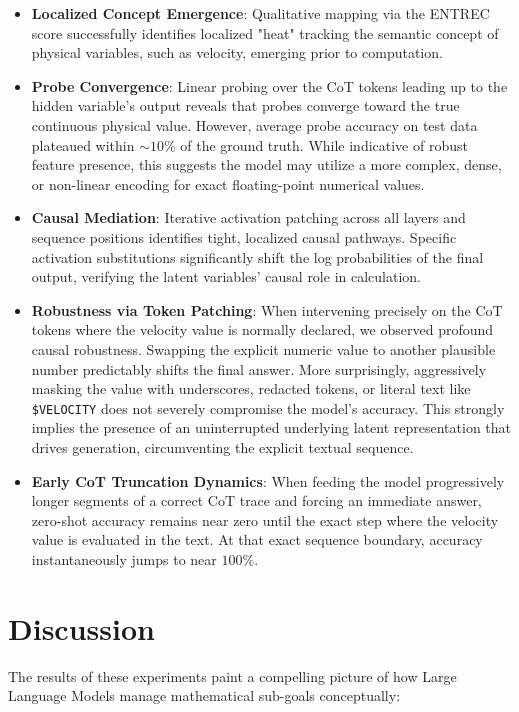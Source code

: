 \documentclass[11pt]{article}
\begin{document}
\begin{itemize}
    \item \textbf{Localized Concept Emergence}: Qualitative mapping via the ENTREC score successfully identifies localized "heat" tracking the semantic concept of physical variables, such as velocity, emerging prior to computation.
    \item \textbf{Probe Convergence}: Linear probing over the CoT tokens leading up to the hidden variable's output reveals that probes converge toward the true continuous physical value. However, average probe accuracy on test data plateaued within $\sim10\%$ of the ground truth. While indicative of robust feature presence, this suggests the model may utilize a more complex, dense, or non-linear encoding for exact floating-point numerical values.
    \item \textbf{Causal Mediation}: Iterative activation patching across all layers and sequence positions identifies tight, localized causal pathways. Specific activation substitutions significantly shift the log probabilities of the final output, verifying the latent variables' causal role in calculation.
    \item \textbf{Robustness via Token Patching}: When intervening precisely on the CoT tokens where the velocity value is normally declared, we observed profound causal robustness. Swapping the explicit numeric value to another plausible number predictably shifts the final answer. More surprisingly, aggressively masking the value with underscores, redacted tokens, or literal text like \texttt{\$VELOCITY} does not severely compromise the model's accuracy. This strongly implies the presence of an uninterrupted underlying latent representation that drives generation, circumventing the explicit textual sequence.
    \item \textbf{Early CoT Truncation Dynamics}: When feeding the model progressively longer segments of a correct CoT trace and forcing an immediate answer, zero-shot accuracy remains near zero until the exact step where the velocity value is evaluated in the text. At that exact sequence boundary, accuracy instantaneously jumps to near $100\%$. 
\end{itemize}

\section{Discussion}

The results of these experiments paint a compelling picture of how Large Language Models manage mathematical sub-goals conceptually:
\end{document}
